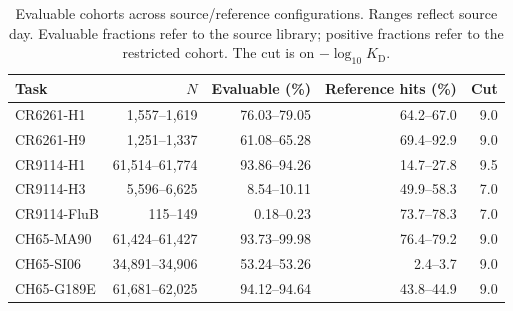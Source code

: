 \begin{table}[t]
\centering\footnotesize
\caption{Evaluable cohorts across source/reference configurations. Ranges reflect source day. Evaluable fractions refer to the source library; positive fractions refer to the restricted cohort. The cut is on $-\log_{10}K_{\mathrm D}$.}
\setlength{\tabcolsep}{4pt}
\begin{tabular}{lrrrr}
\toprule
Task & $N$ & Evaluable (\%) & Reference hits (\%) & Cut \\
\midrule
CR6261-H1 & 1,557--1,619 & 76.03--79.05 & 64.2--67.0 & 9.0 \\
CR6261-H9 & 1,251--1,337 & 61.08--65.28 & 69.4--92.9 & 9.0 \\
CR9114-H1 & 61,514--61,774 & 93.86--94.26 & 14.7--27.8 & 9.5 \\
CR9114-H3 & 5,596--6,625 & 8.54--10.11 & 49.9--58.3 & 7.0 \\
CR9114-FluB & 115--149 & 0.18--0.23 & 73.7--78.3 & 7.0 \\
CH65-MA90 & 61,424--61,427 & 93.73--99.98 & 76.4--79.2 & 9.0 \\
CH65-SI06 & 34,891--34,906 & 53.24--53.26 & 2.4--3.7 & 9.0 \\
CH65-G189E & 61,681--62,025 & 94.12--94.64 & 43.8--44.9 & 9.0 \\
\bottomrule
\end{tabular}
\end{table}
